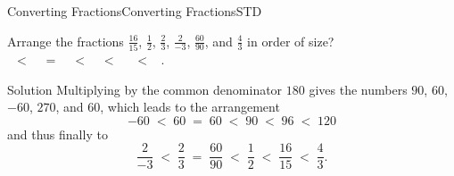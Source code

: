 \begin{MXContent}{Converting Fractions}{Converting Fractions}{STD}
\begin{MExercise}
Arrange the fractions 
$\frac{16}{15}$, $\frac12$, $\frac23$, $\frac2{-3}$, $\frac{60}{90}$, and $\frac43$ in order of size?
\ \\
\ $<$\ 
\ $=$\ 
\ $<$\ 
\ $<$\ 
 \ $<$\ 
 .
\ \\
\begin{MHint}{Solution}
Multiplying by the common denominator $180$ gives the numbers $90$, $60$, $-60$, $270$, and $60$,
which leads to the arrangement
$$
-60\; < \; 60 \; = \; 60 \; < \; 90\; < \; 96 \; < \; 120
$$
and thus finally to 
$$
\frac2{-3} \; < \; \frac23 \;=\; \frac{60}{90} \; <\; \frac12\; < \; \frac{16}{15} \; < \; \frac{4}{3}.
$$
\end{MHint}
\end{MExercise}

\end{MXContent}


